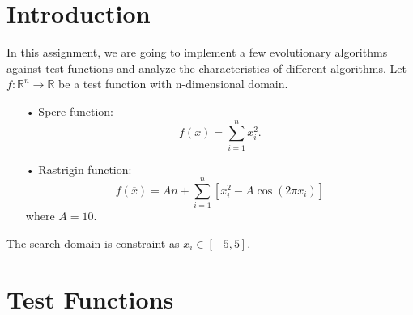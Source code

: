 \documentclass[a4paper,12pt]{article} %
\begin{document}
	\vspace{0.4cm}


\section{Introduction}
In this assignment, we are going to implement a few evolutionary algorithms against test functions and analyze the characteristics of different algorithms.
Let $f : \mathbb{R}^n \rightarrow \mathbb{R}$ be a test function with n-dimensional domain.


\begin{itemize}
	\item[•] Spere function:
	\begin{equation}
		f(\overline{x}) = \sum_{i=1}^nx_i^2 \mbox{.}
	\end{equation}
	\item[•] Rastrigin function:
	\begin{equation}
	f(\overline{x}) = An + \sum_{i=1}^n [x_i^2-A \cos(2\pi x_i)]
	\end{equation}
	where $A = 10$.
\end{itemize}
The search domain is constraint as $x_i \in [-5, 5]$.

\section{Test Functions}
\end{document}
